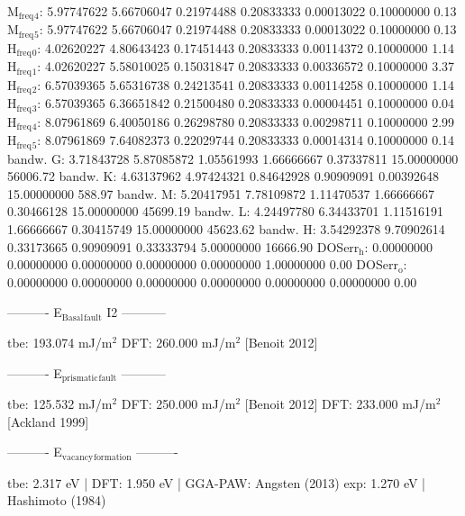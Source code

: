 \documentclass[11pt]{article}
\begin{document}
M\(_{\text{freq}}\)\(_{\text{4}}\):   5.97747622   5.66706047   0.21974488   0.20833333   0.00013022   0.10000000         0.13
M\(_{\text{freq}}\)\(_{\text{5}}\):   5.97747622   5.66706047   0.21974488   0.20833333   0.00013022   0.10000000         0.13
H\(_{\text{freq}}\)\(_{\text{0}}\):   4.02620227   4.80643423   0.17451443   0.20833333   0.00114372   0.10000000         1.14
H\(_{\text{freq}}\)\(_{\text{1}}\):   4.02620227   5.58010025   0.15031847   0.20833333   0.00336572   0.10000000         3.37
H\(_{\text{freq}}\)\(_{\text{2}}\):   6.57039365   5.65316738   0.24213541   0.20833333   0.00114258   0.10000000         1.14
H\(_{\text{freq}}\)\(_{\text{3}}\):   6.57039365   6.36651842   0.21500480   0.20833333   0.00004451   0.10000000         0.04
H\(_{\text{freq}}\)\(_{\text{4}}\):   8.07961869   6.40050186   0.26298780   0.20833333   0.00298711   0.10000000         2.99
H\(_{\text{freq}}\)\(_{\text{5}}\):   8.07961869   7.64082373   0.22029744   0.20833333   0.00014314   0.10000000         0.14
bandw. G:   3.71843728   5.87085872   1.05561993   1.66666667   0.37337811  15.00000000     56006.72
bandw. K:   4.63137962   4.97424321   0.84642928   0.90909091   0.00392648  15.00000000       588.97
bandw. M:   5.20417951   7.78109872   1.11470537   1.66666667   0.30466128  15.00000000     45699.19
bandw. L:   4.24497780   6.34433701   1.11516191   1.66666667   0.30415749  15.00000000     45623.62
bandw. H:   3.54292378   9.70902614   0.33173665   0.90909091   0.33333794   5.00000000     16666.90
DOSerr\(_{\text{h}}\):   0.00000000   0.00000000   0.00000000   0.00000000   0.00000000   1.00000000         0.00
DOSerr\(_{\text{o}}\):   0.00000000   0.00000000   0.00000000   0.00000000   0.00000000   0.00000000         0.00

----------     E\(_{\text{Basal}}\)\(_{\text{fault}}\) I2     -----------

tbe:       193.074 mJ/m\(^{\text{2}}\)
DFT:       260.000 mJ/m\(^{\text{2}}\) [Benoit  2012]

----------     E\(_{\text{prismatic}}\)\(_{\text{fault}}\)     -----------

tbe:       125.532 mJ/m\(^{\text{2}}\)
DFT:       250.000 mJ/m\(^{\text{2}}\) [Benoit  2012]
DFT:       233.000 mJ/m\(^{\text{2}}\) [Ackland 1999]

----------     E\(_{\text{vacancy}}\)\(_{\text{formation}}\)     ----------

tbe:      2.317 eV  |
DFT:      1.950 eV  |  GGA-PAW: Angsten (2013) 
exp:      1.270 eV  |  Hashimoto (1984)
\end{document}
